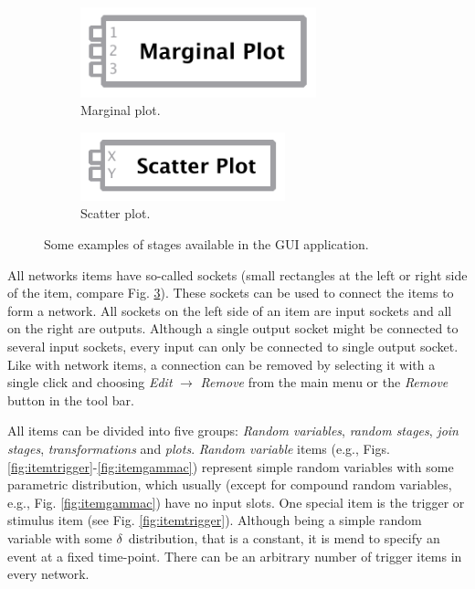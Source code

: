 \begin{figure}[!ht]
  \begin{subfigure}[c]{0.4\textwidth}
    \centering
 	\includegraphics[width=0.75\textwidth]{fig/guiplot.pdf}
 	\caption{Marginal plot.} \label{fig:itemplot}
 \end{subfigure}\hfill
  \begin{subfigure}[c]{0.4\textwidth}
    \centering
 	\includegraphics[width=0.65\textwidth]{fig/guiscatter.pdf}
 	\caption{Scatter plot.} \label{fig:itemscatter}
 \end{subfigure}
 \caption{Some examples of stages available in the GUI application.} \label{fig:items}
\end{figure}

All networks items have so-called sockets (small rectangles at the left or right side of the item, compare Fig. \ref{fig:items}). These sockets can be used to connect the items to form a network. All sockets on the left side of an item are input sockets and all on the right are outputs. Although a single output socket might be connected to several input sockets, every input can only be connected to single output socket. Like with network items, a connection can be removed by selecting it with a single click and choosing \emph{Edit} $\rightarrow$ \emph{Remove} from the main menu or the \emph{Remove} button in the tool bar.

All items can be divided into five groups: \emph{Random variables}, \emph{random stages}, \emph{join stages}, \emph{transformations} and \emph{plots}. \emph{Random variable} items (e.g., Figs. \ref{fig:itemtrigger}-\ref{fig:itemgammac}) represent simple random variables with some parametric distribution, which usually (except for compound random variables, e.g., Fig. \ref{fig:itemgammac}) have no input slots. One special item is the trigger or stimulus item (see Fig. \ref{fig:itemtrigger}). Although being a simple random variable with some $\delta$~distribution, that is a constant, it is mend to specify an event at a fixed time-point. There can be an arbitrary number of trigger items in every network.

